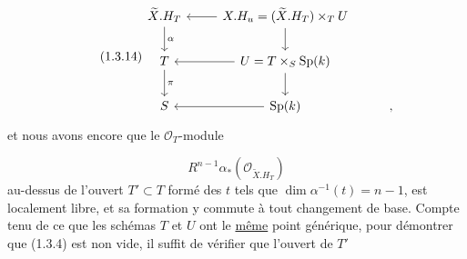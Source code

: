 \begin{equation}\tag{1.3.14}
\begin{tikzcd}
\widetilde{X}.H_T \arrow[d, "\alpha"] & X.H_u = (\widetilde{X}.H_T) \times_T U \arrow[l] \arrow[d] \\
T \arrow[d, "\pi"] & U = T \times_S \mathrm{Sp}(k) \arrow[l] \arrow[d] \\
S & \mathrm{Sp}(k) \arrow[l] & ,
\end{tikzcd}
\end{equation}
et nous avons encore que le $\mathcal{O}_T$-module

\begin{equation}\tag{1.3.15}
R^{n-1}\alpha_*(\mathcal{O}_{\widetilde{X}.H_T})
\end{equation}
au-dessus de l'ouvert $T' \subset T$ formé des $t$ tels que $\dim \alpha^{-1}(t) = n-1$, est localement libre, et sa formation y commute à tout changement de base. Compte tenu de ce que les schémas $T$ et $U$ ont le \underline{même} point générique, pour démontrer que (1.3.4) est non vide, il suffit de vérifier que l'ouvert de $T'$

